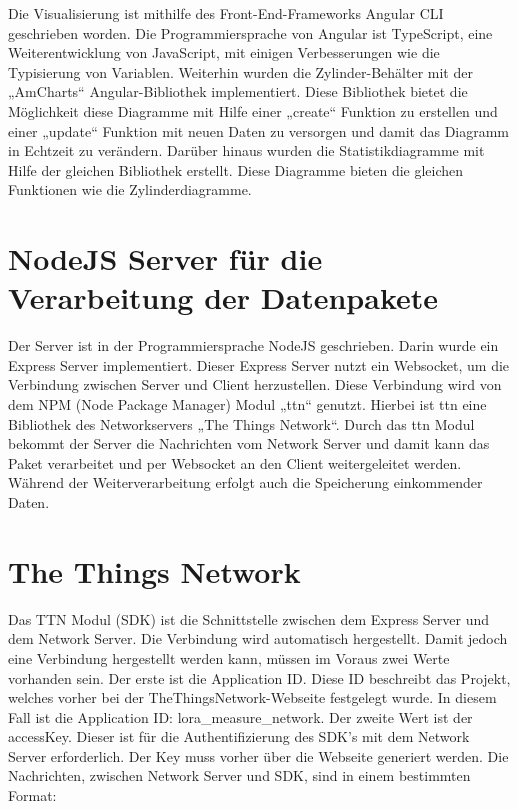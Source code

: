 Die Visualisierung ist mithilfe des Front-End-Frameworks Angular CLI geschrieben worden. Die Programmiersprache von Angular ist TypeScript, eine Weiterentwicklung von JavaScript, mit einigen Verbesserungen wie die Typisierung von Variablen. Weiterhin wurden die Zylinder-Behälter mit der „AmCharts“ Angular-Bibliothek implementiert. Diese Bibliothek bietet die Möglichkeit diese Diagramme mit Hilfe einer „create“ Funktion zu erstellen und einer „update“ Funktion mit neuen Daten zu versorgen und damit das Diagramm in Echtzeit zu verändern. Darüber hinaus wurden die Statistikdiagramme mit Hilfe der gleichen Bibliothek erstellt. Diese Diagramme bieten die gleichen Funktionen wie die Zylinderdiagramme.

\section{NodeJS Server für die Verarbeitung der Datenpakete}
Der Server ist in der Programmiersprache NodeJS geschrieben. Darin wurde ein Express Server implementiert. Dieser Express Server nutzt ein Websocket, um die Verbindung zwischen Server und Client herzustellen. Diese Verbindung wird von dem NPM (Node Package Manager) Modul „ttn“ genutzt. Hierbei ist ttn eine Bibliothek des Networkservers „The Things Network“. Durch das ttn Modul bekommt der Server die Nachrichten vom Network Server und damit kann das Paket verarbeitet und per Websocket an den Client weitergeleitet werden. Während der Weiterverarbeitung erfolgt auch die Speicherung einkommender Daten.

\section{The Things Network}
Das TTN Modul (SDK) ist die Schnittstelle zwischen dem Express Server und dem Network Server. Die Verbindung wird automatisch hergestellt. Damit jedoch eine Verbindung hergestellt werden kann, müssen im Voraus zwei Werte vorhanden sein. Der erste ist die Application ID. Diese ID beschreibt das Projekt, welches vorher bei der TheThingsNetwork-Webseite festgelegt wurde. In diesem Fall ist die Application ID: lora\_measure\_network. Der zweite Wert ist der accessKey. Dieser ist für die Authentifizierung des SDK’s mit dem Network Server erforderlich. Der Key muss vorher über die Webseite generiert werden. Die Nachrichten, zwischen Network Server und SDK, sind in einem bestimmten Format:\\

